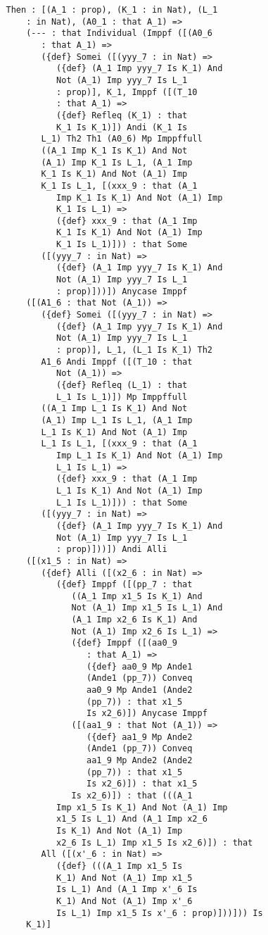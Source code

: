 \documentclass{article}
\begin{document}
\begin{verbatim}
   Then : [(A_1 : prop), (K_1 : in Nat), (L_1 
       : in Nat), (A0_1 : that A_1) => 
       (--- : that Individual (Imppf ([(A0_6 
          : that A_1) => 
          ({def} Somei ([(yyy_7 : in Nat) => 
             ({def} (A_1 Imp yyy_7 Is K_1) And 
             Not (A_1) Imp yyy_7 Is L_1 
             : prop)], K_1, Imppf ([(T_10 
             : that A_1) => 
             ({def} Refleq (K_1) : that 
             K_1 Is K_1)]) Andi (K_1 Is 
          L_1) Th2 Th1 (A0_6) Mp Imppffull 
          ((A_1 Imp K_1 Is K_1) And Not 
          (A_1) Imp K_1 Is L_1, (A_1 Imp 
          K_1 Is K_1) And Not (A_1) Imp 
          K_1 Is L_1, [(xxx_9 : that (A_1 
             Imp K_1 Is K_1) And Not (A_1) Imp 
             K_1 Is L_1) => 
             ({def} xxx_9 : that (A_1 Imp 
             K_1 Is K_1) And Not (A_1) Imp 
             K_1 Is L_1)])) : that Some 
          ([(yyy_7 : in Nat) => 
             ({def} (A_1 Imp yyy_7 Is K_1) And 
             Not (A_1) Imp yyy_7 Is L_1 
             : prop)]))]) Anycase Imppf 
       ([(A1_6 : that Not (A_1)) => 
          ({def} Somei ([(yyy_7 : in Nat) => 
             ({def} (A_1 Imp yyy_7 Is K_1) And 
             Not (A_1) Imp yyy_7 Is L_1 
             : prop)], L_1, (L_1 Is K_1) Th2 
          A1_6 Andi Imppf ([(T_10 : that 
             Not (A_1)) => 
             ({def} Refleq (L_1) : that 
             L_1 Is L_1)]) Mp Imppffull 
          ((A_1 Imp L_1 Is K_1) And Not 
          (A_1) Imp L_1 Is L_1, (A_1 Imp 
          L_1 Is K_1) And Not (A_1) Imp 
          L_1 Is L_1, [(xxx_9 : that (A_1 
             Imp L_1 Is K_1) And Not (A_1) Imp 
             L_1 Is L_1) => 
             ({def} xxx_9 : that (A_1 Imp 
             L_1 Is K_1) And Not (A_1) Imp 
             L_1 Is L_1)])) : that Some 
          ([(yyy_7 : in Nat) => 
             ({def} (A_1 Imp yyy_7 Is K_1) And 
             Not (A_1) Imp yyy_7 Is L_1 
             : prop)]))]) Andi Alli 
       ([(x1_5 : in Nat) => 
          ({def} Alli ([(x2_6 : in Nat) => 
             ({def} Imppf ([(pp_7 : that 
                ((A_1 Imp x1_5 Is K_1) And 
                Not (A_1) Imp x1_5 Is L_1) And 
                (A_1 Imp x2_6 Is K_1) And 
                Not (A_1) Imp x2_6 Is L_1) => 
                ({def} Imppf ([(aa0_9 
                   : that A_1) => 
                   ({def} aa0_9 Mp Ande1 
                   (Ande1 (pp_7)) Conveq 
                   aa0_9 Mp Ande1 (Ande2 
                   (pp_7)) : that x1_5 
                   Is x2_6)]) Anycase Imppf 
                ([(aa1_9 : that Not (A_1)) => 
                   ({def} aa1_9 Mp Ande2 
                   (Ande1 (pp_7)) Conveq 
                   aa1_9 Mp Ande2 (Ande2 
                   (pp_7)) : that x1_5 
                   Is x2_6)]) : that x1_5 
                Is x2_6)]) : that (((A_1 
             Imp x1_5 Is K_1) And Not (A_1) Imp 
             x1_5 Is L_1) And (A_1 Imp x2_6 
             Is K_1) And Not (A_1) Imp 
             x2_6 Is L_1) Imp x1_5 Is x2_6)]) : that 
          All ([(x'_6 : in Nat) => 
             ({def} (((A_1 Imp x1_5 Is 
             K_1) And Not (A_1) Imp x1_5 
             Is L_1) And (A_1 Imp x'_6 Is 
             K_1) And Not (A_1) Imp x'_6 
             Is L_1) Imp x1_5 Is x'_6 : prop)]))])) Is 
       K_1)]



\end{verbatim}
\end{document}
